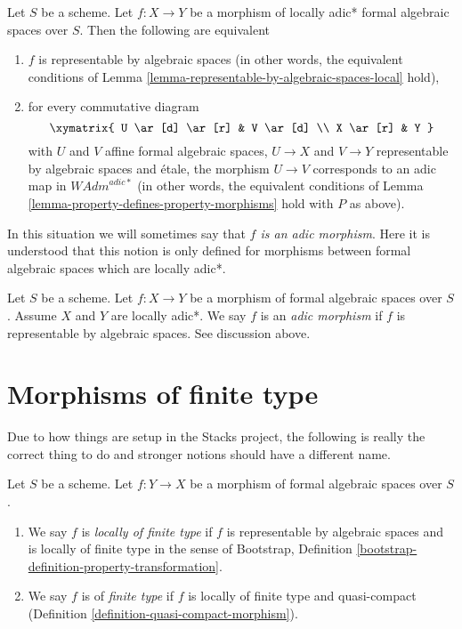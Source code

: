 \medskip\noindent
Let $S$ be a scheme. Let $f : X \to Y$ be a morphism of
locally adic* formal algebraic spaces over $S$. Then the following
are equivalent
\begin{enumerate}
\item $f$ is representable by algebraic spaces (in other words, the
equivalent conditions of
Lemma \ref{lemma-representable-by-algebraic-spaces-local} hold),
\item for every commutative diagram
$$
\xymatrix{
U \ar[d] \ar[r] & V \ar[d] \\
X \ar[r] & Y
}
$$
with $U$ and $V$ affine formal algebraic spaces, $U \to X$ and $V \to Y$
representable by algebraic spaces and \'etale, the morphism $U \to V$
corresponds to an adic map in $\textit{WAdm}^{adic*}$
(in other words, the equivalent conditions of
Lemma \ref{lemma-property-defines-property-morphisms}
hold with $P$ as above).
\end{enumerate}
In this situation we will sometimes say that {\it $f$ is an adic morphism}.
Here it is understood that this notion is only defined for morphisms
between formal algebraic spaces which are locally adic*.

\begin{definition}
\label{definition-adic-morphism}
Let $S$ be a scheme. Let $f : X \to Y$ be a morphism of formal algebraic
spaces over $S$. Assume $X$ and $Y$ are locally adic*. We say $f$ is
an {\it adic morphism} if $f$ is representable by algebraic spaces.
See discussion above.
\end{definition}











\section{Morphisms of finite type}
\label{section-finite-type}

\noindent
Due to how things are setup in the Stacks project, the following
is really the correct thing to do and stronger notions should have
a different name.

\begin{definition}
\label{definition-finite-type}
Let $S$ be a scheme. Let $f : Y \to X$ be a morphism of formal algebraic
spaces over $S$.
\begin{enumerate}
\item We say $f$ is {\it locally of finite type}
if $f$ is representable by algebraic spaces and is locally
of finite type in the sense of
Bootstrap, Definition \ref{bootstrap-definition-property-transformation}.
\item We say $f$ is of {\it finite type} if $f$ is locally of finite type and
quasi-compact (Definition \ref{definition-quasi-compact-morphism}).
\end{enumerate}
\end{definition}

